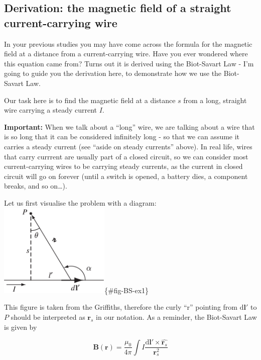 \documentclass[
  letterpaper,
  DIV=11,
  numbers=noendperiod]{scrreprt}
\begin{document}
\subsection{Derivation: the magnetic field of a straight
current-carrying
wire}\label{derivation-the-magnetic-field-of-a-straight-current-carrying-wire}

In your previous studies you may have come across the formula for the
magnetic field at a distance from a current-carrying wire. Have you ever
wondered where this equation came from? Turns out it is derived using
the Biot-Savart Law - I'm going to guide you the derivation here, to
demonstrate how we use the Biot-Savart Law.

Our task here is to find the magnetic field at a distance \(s\) from a
long, straight wire carrying a steady current \(I\).

\textbf{Important:} When we talk about a ``long'' wire, we are talking
about a wire that is so long that it can be considered infinitely long -
so that we can assume it carries a steady current (see ``aside on steady
currents'' above). In real life, wires that carry currrent are usually
part of a closed circuit, so we can consider most current-carrying wires
to be carrying steady currents, as the current in closed circuit will go
on forever (until a switch is opened, a battery dies, a component
breaks, and so on\ldots).

Let us first visualise the problem with a diagram:
\includegraphics[width=2.08333in,height=\textheight]{Figures/BS-example-1.png}\{\#fig-BS-ex1\}

This figure is taken from the Griffiths, therefore the curly ``r''
pointing from \(\mathrm{d} \mathrm{\mathbf{l}}'\) to \(P\) should be
interpreted as \(\mathrm{\mathbf{r}}_s\) in our notation. As a reminder,
the Biot-Savart Law is given by

\[\mathrm{\mathbf{B}}(\mathrm{\mathbf{r}}) =  \frac{\mu_0}{4\pi} \int I \frac{\mathrm{d} \mathrm{\mathbf{l}}' \times \hat{\mathrm{\mathbf{r}}_s} }{\mathrm{\mathbf{r}}_s^2} \]
\end{document}
